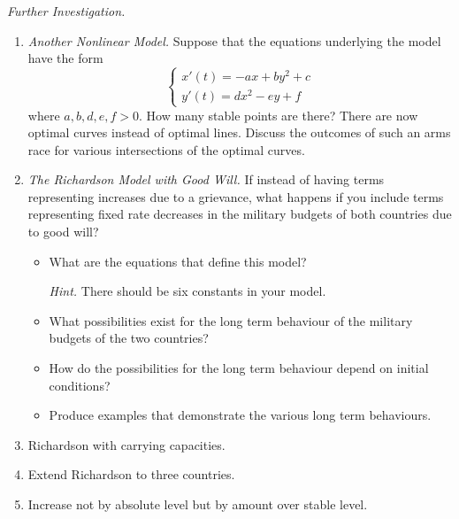 \emph{Further Investigation.}
\begin{enumerate}[label=\emph{\arabic*.}]
\item \emph{Another Nonlinear Model.} Suppose that the equations underlying the model have the form
$$
\begin{cases}
x'(t) = -ax+by^2+c\\
y'(t) =dx^2-ey+f	
\end{cases}
$$
where $a,b,d,e,f>0$. How many stable points are there? 
There are now optimal curves instead of optimal lines. 
Discuss the outcomes of such an arms race for various intersections of the optimal curves.

\item \emph{The Richardson Model with Good Will.} If instead of having terms representing increases due to a grievance, what happens if you include terms representing fixed rate decreases in the military budgets of both countries due to good will?
\begin{itemize}
\item What are the equations that define this model? 

\emph{Hint.} There should be six constants in your model.

\item What possibilities exist for the long term behaviour of the military budgets of the two countries?
\item How do the possibilities for the long term behaviour depend on initial conditions?
\item Produce examples that demonstrate the various long term behaviours.
\end{itemize}

\item Richardson with carrying capacities.

\item Extend Richardson to three countries.

\item Increase not by absolute level but by amount over stable level.
\end{enumerate}

\begin{noexercises}
\end{noexercises}
